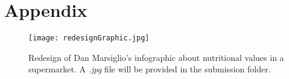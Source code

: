 \section{Appendix}

\begin{figure}[ht]
  \centering
	\texttt{[image: redesignGraphic.jpg]}
	\caption{Redesign of Dan Marsiglio's infographic about nutritional values in a
	supermarket. A \textit{.jpg} file will be provided in the submission folder.}
	\label{redesignGraphic}
\end{figure}

